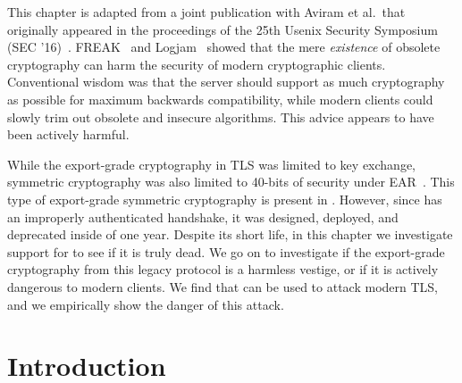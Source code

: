 \newcommand{\DrownPaper}{papers/drown/paper}
\newcommand{\DrownFigures}{papers/drown/figures}



\newif\ifext\extfalse
\newif\ifdraft\draftfalse
\newif\ifblind\blindtrue
\newif\ifsubmit\submitfalse

\draftfalse
\blindfalse




This chapter is adapted from a joint publication with Aviram et al.\ that
originally appeared in the proceedings of the 25th Usenix Security Symposium
(SEC '16)~\cite{drown-2016}. FREAK~\cite{freak-attack-2015} and
Logjam~\cite{logjam-2015} showed that the mere \textit{existence} of obsolete
cryptography can harm the security of modern cryptographic clients.
Conventional wisdom was that the server should support as much cryptography
as possible for maximum backwards compatibility, while modern clients could
slowly trim out obsolete and insecure algorithms. This advice appears to have
been actively harmful.

While the export-grade cryptography in TLS was limited to key exchange,
symmetric cryptography was also limited to 40-bits of security under
EAR~\cite{ear-2001-cat-5}. This type of export-grade symmetric cryptography
is present in \ssltwo. However, since \ssltwo has an improperly authenticated
handshake, it was designed, deployed, and deprecated inside of one year.
Despite its short life, in this chapter we investigate support for \ssltwo to
see if it is truly dead. We go on to investigate if the export-grade
cryptography from this legacy protocol is a harmless vestige, or if it is
actively dangerous to modern clients. We find that \ssltwo can be used to
attack modern TLS, and we empirically show the danger of this attack.



\section{Introduction}


